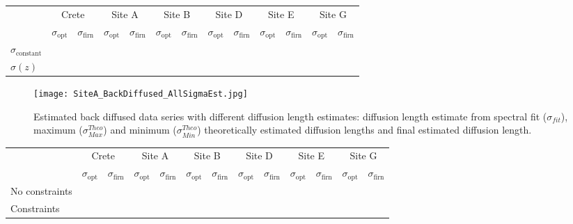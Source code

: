 \documentclass[../../CompleteThesis/Complete_1stDraft]{subfiles}
\begin{document}
	\begin{table}[ht]
		\centering
		\begin{tabular}{l||*{6}{c | c||}}
			&
			\multicolumn{2}{c}{Crete} & \multicolumn{2}{c}{Site A} & \multicolumn{2}{c}{Site B} & \multicolumn{2}{c}{Site D} & \multicolumn{2}{c}{Site E} & \multicolumn{2}{c||}{Site G} \\
			&
			$\sigma_{\text{opt}}$ & $\sigma_{\text{firn}}$ & $\sigma_{\text{opt}}$ & $\sigma_{\text{firn}}$ & $\sigma_{\text{opt}}$ & $\sigma_{\text{firn}}$ & $\sigma_{\text{opt}}$ & $\sigma_{\text{firn}}$ & $\sigma_{\text{opt}}$ & $\sigma_{\text{firn}}$ & $\sigma_{\text{opt}}$ & $\sigma_{\text{firn}}$ \\
			
			\hline
			$\sigma_{\text{constant}}$ & & & & & & & & & & & & \\ 
			$\sigma(z)$ & & & & & & & & & & & & \\ 
		\end{tabular}
	\end{table}
	
	\begin{figure}
		\centering
		\texttt{[image: SiteA\_BackDiffused\_AllSigmaEst.jpg]}
		\caption[All diffusion length estimate deconvolutions, Site A]{Estimated back diffused data series with different diffusion length estimates: diffusion length estimate from spectral fit ($\sigma_{fit}$), maximum ($\sigma_{Max}^{Theo}$) and minimum ($\sigma_{Min}^{Theo}$) theoretically estimated diffusion lengths and final estimated diffusion length.}
		\label{fig:SiteA_BackDiffused_AllSigmaEst}
	\end{figure}
	
	\begin{table}[ht]
		\centering
		\begin{tabular}{l||*{6}{c | c||}}
			&
			\multicolumn{2}{c}{Crete} & \multicolumn{2}{c}{Site A} & \multicolumn{2}{c}{Site B} & \multicolumn{2}{c}{Site D} & \multicolumn{2}{c}{Site E} & \multicolumn{2}{c||}{Site G} \\
			&
			$\sigma_{\text{opt}}$ & $\sigma_{\text{firn}}$ & $\sigma_{\text{opt}}$ & $\sigma_{\text{firn}}$ & $\sigma_{\text{opt}}$ & $\sigma_{\text{firn}}$ & $\sigma_{\text{opt}}$ & $\sigma_{\text{firn}}$ & $\sigma_{\text{opt}}$ & $\sigma_{\text{firn}}$ & $\sigma_{\text{opt}}$ & $\sigma_{\text{firn}}$ \\
			
			\hline
			No constraints & & & & & & & & & & & & \\ 
			Constraints & & & & & & & & & & & & \\ 
		\end{tabular}
	\end{table}
	
	
\end{document}
